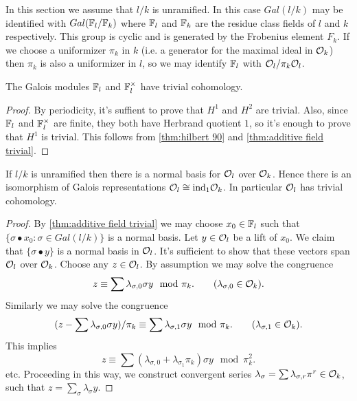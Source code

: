In this section we assume that $l/k$ is unramified.
In this case $Gal(l/k)$ may be identified with $Gal({\mathbb F}_l / {\mathbb F}_k)$ where
${\mathbb F}_l$ and ${\mathbb F}_k$ are the residue class fields of $l$ and $k$ respectively.
This group is cyclic and is generated by the Frobenius element $F_k$.
If we choose a uniformizer $\pi_k$ in $k$ (i.e. a generator for the maximal ideal in ${\mathcal O}_k$)
then $\pi_k$ is also a uniformizer in $l$, so we may identify ${\mathbb F}_l$ with ${\mathcal O}_l / \pi_k {\mathcal O}_l$.

\begin{lemma} \label{lem:finite field trivial}
	The Galois modules ${\mathbb F}_l$ and ${\mathbb F}_l^\times$ have trivial cohomology.
\end{lemma}

\begin{proof}
	By periodicity, it's suffient to prove that $H^1$ and $H^2$ are trivial.
	Also, since ${\mathbb F}_l$ and ${\mathbb F}_l^\times$ are finite, they both have Herbrand quotient $1$,
	so it's enough to prove that $H^1$ is trivial.
	This follows from \ref{thm:hilbert 90} and \ref{thm:additive field trivial}.
\end{proof}


\begin{lemma} \label{lem:unramified additive trivial}
	If $l/k$ is unramified then there is a normal basis for ${\mathcal O}_l$ over ${\mathcal O}_k$.
	Hence there is an isomorphism of Galois representations ${\mathcal O}_l \cong \mathrm{ind}_1 {\mathcal O}_k$.
	In particular ${\mathcal O}_l$ has trivial cohomology.
\end{lemma}

\begin{proof}
	By \ref{thm:additive field trivial}
	we may choose $x_0 \in {\mathbb F}_l$
	such that $\{\sigma \bullet x_0 :\sigma \in Gal(l/k)\}$ is a normal basis.
	Let $y \in {\mathcal O}_l$ be a lift of $x_0$.
	We claim that $\{\sigma \bullet y\}$ is a normal basis
	in ${\mathcal O}_l$. It's sufficient to show that these vectors span ${\mathcal O}_l$ over ${\mathcal O}_k$.
	Choose any $z \in {\mathcal O}_l$. By assumption we may solve the congruence
	\[
		z \equiv \sum \lambda_{\sigma,0} \sigma y \mod \pi_k.
		\qquad
		(\lambda_{\sigma,0} \in {\mathcal O}_k).
	\]
	Similarly we may solve the congruence
	\[
		(z - \sum \lambda_{\sigma,0} \sigma y) / \pi_k \equiv \sum \lambda_{\sigma,1} \sigma y \mod \pi_k.
		\qquad
		(\lambda_{\sigma,1} \in {\mathcal O}_k).
	\]
	This implies
	\[
		z \equiv \sum (\lambda_{\sigma,0} + \lambda_{\sigma_1} \pi_k) \sigma y \mod \pi_k^2.
	\]
	etc.
	Proceeding in this way, we construct convergent series
	$\lambda_{\sigma} = \sum \lambda_{\sigma,r}\pi^r \in {\mathcal O}_k$,
	such that $z = \sum_\sigma \lambda_\sigma y$.
\end{proof}




